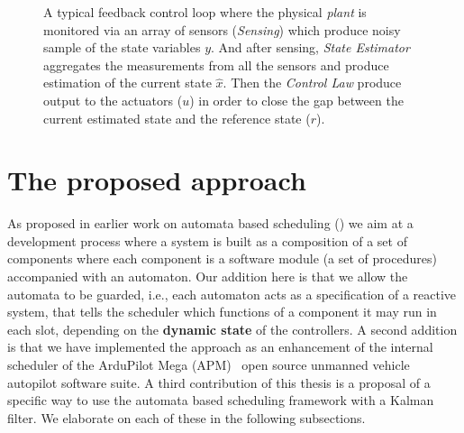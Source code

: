 \documentclass[ twoside, 12pt ]{article}
\begin{document}
\begin{figure}[]
    \centering
    
    
    \caption{A typical feedback control loop where the physical \textit{plant} is monitored via an array of sensors (\textit{Sensing}) which produce noisy sample of the state variables $y$. 
    And after sensing, \textit{State Estimator} aggregates the measurements from all the sensors and produce estimation of the current state $\hat{x}$. Then the \textit{Control Law} produce output to the actuators ($u$) in order to close the gap between the current estimated state and the reference state ($r$).
    \label{fig:control loop}}
\end{figure}

\section{The proposed approach} %
\label{sec:architecture}

As proposed in earlier work on automata based scheduling (\cite{weiss2007automata,RTComposer,AW08}) we aim at a development process where a system is built as a composition of a set of components where each component is a software module (a set of procedures) accompanied with an automaton. Our addition here is that we allow the automata to be guarded, i.e., each automaton acts as a specification of a reactive system, that tells the scheduler which functions of a component it may run in each slot, depending on the \textbf{dynamic state} of the controllers. A second addition is that we have implemented the approach as an enhancement of the internal scheduler of the ArduPilot Mega (APM)~\cite{APM} open source unmanned vehicle autopilot software suite. A third contribution of this thesis is a proposal of a specific way to use the automata based scheduling framework with a Kalman filter. We elaborate on each of these in the following subsections.
\end{document}
